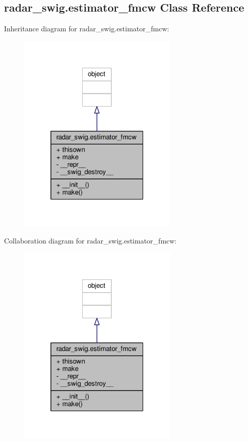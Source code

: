 \subsection{radar\+\_\+swig.\+estimator\+\_\+fmcw Class Reference}
\label{classradar__swig_1_1estimator__fmcw}


Inheritance diagram for radar\+\_\+swig.\+estimator\+\_\+fmcw\+:
\nopagebreak
\begin{figure}[H]
\begin{center}
\leavevmode
\includegraphics[width=217pt]{d3/dc7/classradar__swig_1_1estimator__fmcw__inherit__graph}
\end{center}
\end{figure}


Collaboration diagram for radar\+\_\+swig.\+estimator\+\_\+fmcw\+:
\nopagebreak
\begin{figure}[H]
\begin{center}
\leavevmode
\includegraphics[width=217pt]{d9/d3c/classradar__swig_1_1estimator__fmcw__coll__graph}
\end{center}
\end{figure}
